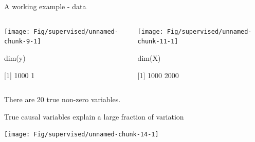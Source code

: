 \documentclass[
  ignorenonframetext,
  aspectratio=169]{beamer}
\newenvironment{Shaded}{\begin{snugshade}}{\end{snugshade}}
\newcommand{\AttributeTok}[1]{\textcolor[rgb]{0.77,0.63,0.00}{#1}}
\newcommand{\ConstantTok}[1]{\textcolor[rgb]{0.00,0.00,0.00}{#1}}
\newcommand{\DecValTok}[1]{\textcolor[rgb]{0.00,0.00,0.81}{#1}}
\newcommand{\FunctionTok}[1]{\textcolor[rgb]{0.00,0.00,0.00}{#1}}
\newcommand{\NormalTok}[1]{#1}
\newcommand{\OtherTok}[1]{\textcolor[rgb]{0.56,0.35,0.01}{#1}}
\newcommand{\SpecialCharTok}[1]{\textcolor[rgb]{0.00,0.00,0.00}{#1}}
\begin{document}
\begin{frame}[fragile]{A working example - data}
\protect\hypertarget{a-working-example---data}{}
\begin{columns}[T]
\begin{column}{.45\textwidth}
\scriptsize

\begin{center}\texttt{[image: Fig/supervised/unnamed-chunk-9-1]} \end{center}

\normalsize

\scriptsize

\begin{Shaded}
\begin{Highlighting}[]
\FunctionTok{dim}\NormalTok{(y)}
\end{Highlighting}
\end{Shaded}

{[}1{]} 1000 1

\normalsize
\end{column}

\begin{column}{.45\textwidth}
\scriptsize

\begin{center}\texttt{[image: Fig/supervised/unnamed-chunk-11-1]} \end{center}

\normalsize

\scriptsize

\begin{Shaded}
\begin{Highlighting}[]
\FunctionTok{dim}\NormalTok{(X)}
\end{Highlighting}
\end{Shaded}

{[}1{]} 1000 2000

\normalsize
\end{column}
\end{columns}

There are 20 true non-zero variables.
\end{frame}

\begin{frame}[fragile]{True causal variables explain a large fraction of
variation}
\protect\hypertarget{true-causal-variables-explain-a-large-fraction-of-variation}{}
\scriptsize

\begin{Shaded}
\end{Shaded}

\normalsize

\scriptsize

\begin{center}\texttt{[image: Fig/supervised/unnamed-chunk-14-1]} \end{center}

\normalsize
\end{frame}
\end{document}

